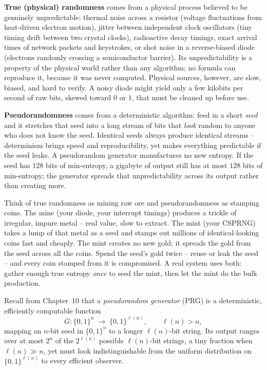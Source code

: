 \textbf{True (physical) randomness} comes from a physical process believed to be genuinely unpredictable: thermal noise across a resistor (voltage fluctuations from heat-driven electron motion), jitter between independent clock oscillators (tiny timing drift between two crystal clocks), radioactive decay timings, exact arrival times of network packets and keystrokes, or shot noise in a reverse-biased diode (electrons randomly crossing a semiconductor barrier). Its unpredictability is a property of the physical world rather than any algorithm; no formula can reproduce it, because it was never computed. Physical sources, however, are slow, biased, and hard to verify. A noisy diode might yield only a few kilobits per second of raw bits, skewed toward $0$ or $1$, that must be cleaned up before use.

\textbf{Pseudorandomness} comes from a deterministic algorithm: feed in a short \emph{seed} and it stretches that seed into a long stream of bits that \emph{look} random to anyone who does not know the seed. Identical seeds always produce identical streams -- determinism brings speed and reproducibility, yet makes everything predictable if the seed leaks. A pseudorandom generator manufactures no new entropy. If the seed has $128$ bits of min-entropy, a gigabyte of output still has at most $128$ bits of min-entropy; the generator spreads that unpredictability across its output rather than creating more.

\begin{intuitionbox}
Think of true randomness as mining raw ore and pseudorandomness as stamping coins. The mine (your diode, your interrupt timings) produces a trickle of irregular, impure metal -- real value, slow to extract. The mint (your CSPRNG) takes a lump of that metal as a seed and stamps out millions of identical-looking coins fast and cheaply. The mint creates no new gold; it spreads the gold from the seed across all the coins. Spend the seed's gold twice -- reuse or leak the seed -- and every coin stamped from it is compromised. A real system uses both: gather enough true entropy \emph{once} to seed the mint, then let the mint do the bulk production.
\end{intuitionbox}

\begin{formalbox}
Recall from Chapter~10 that a \emph{pseudorandom generator} (PRG) is a deterministic, efficiently computable function
\[
  G:\{0,1\}^n \;\to\; \{0,1\}^{\ell(n)}, \qquad \ell(n) > n,
\]
mapping an $n$-bit seed in $\{0,1\}^n$ to a longer $\ell(n)$-bit string. Its output ranges over at most $2^n$ of the $2^{\ell(n)}$ possible $\ell(n)$-bit strings, a tiny fraction when $\ell(n) \gg n$, yet must look indistinguishable from the uniform distribution on $\{0,1\}^{\ell(n)}$ to every efficient observer.
\end{formalbox}

